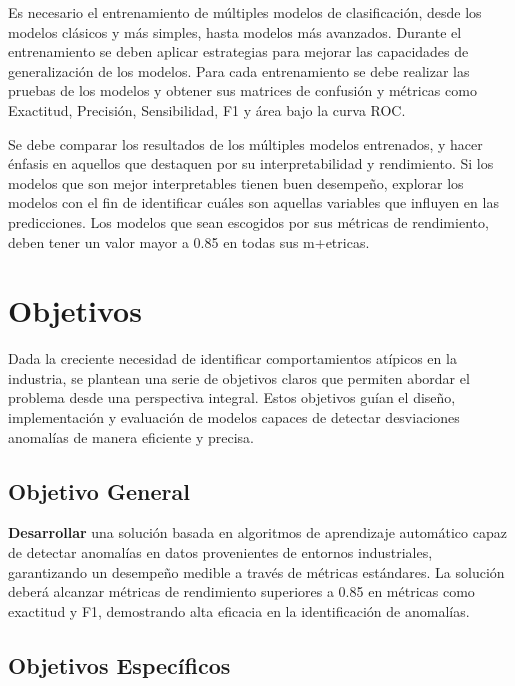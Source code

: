 \documentclass[11pt,a4paper,spanish]{book}
\numberwithin{equation}{chapter}
\numberwithin{figure}{chapter}
\begin{document}
Es necesario el entrenamiento de múltiples modelos de clasificación, desde los modelos clásicos y más simples, hasta modelos más avanzados. Durante el entrenamiento se deben aplicar estrategias para mejorar las capacidades de generalización de los modelos. Para cada entrenamiento se debe realizar las pruebas de los modelos y obtener sus matrices de confusión y métricas como  Exactitud, Precisión, Sensibilidad, F1 y área bajo la curva ROC.


Se debe comparar los resultados de los múltiples modelos entrenados, y hacer énfasis en aquellos que destaquen por su interpretabilidad y rendimiento. Si los modelos que son mejor interpretables tienen buen desempeño, explorar los modelos con el fin de identificar cuáles son aquellas variables que influyen en las predicciones. Los modelos que sean escogidos por sus métricas de rendimiento, deben tener un valor mayor a 0.85 en todas sus m+etricas. 


\chapter{Objetivos}

Dada la creciente necesidad de identificar comportamientos atípicos en la industria, 
se plantean una serie de objetivos claros que permiten abordar el problema desde una 
perspectiva integral. 
Estos objetivos guían el diseño, implementación y evaluación de modelos capaces de 
detectar desviaciones anomalías de manera eficiente y precisa.


\section{Objetivo General}

\textbf{Desarrollar} una solución basada en algoritmos de aprendizaje automático 
capaz de detectar anomalías en datos provenientes de entornos industriales, garantizando
un desempeño medible a través de métricas estándares.
La solución deberá alcanzar métricas de rendimiento superiores a 0.85 en métricas como
exactitud y F1, demostrando alta eficacia en la identificación de anomalías.

\section{Objetivos Específicos}
\end{document}
